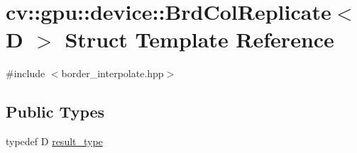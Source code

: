 \hypertarget{structcv_1_1gpu_1_1device_1_1BrdColReplicate}{\section{cv\-:\-:gpu\-:\-:device\-:\-:Brd\-Col\-Replicate$<$ D $>$ Struct Template Reference}
\label{structcv_1_1gpu_1_1device_1_1BrdColReplicate}
}


{\ttfamily \#include $<$border\-\_\-interpolate.\-hpp$>$}

\subsection*{Public Types}
\begin{DoxyCompactItemize}
\item 
typedef D \hyperlink{structcv_1_1gpu_1_1device_1_1BrdColReplicate_a79eaad7da13304d93c2257c3b3d5dac9}{result\-\_\-type}
\end{DoxyCompactItemize}
